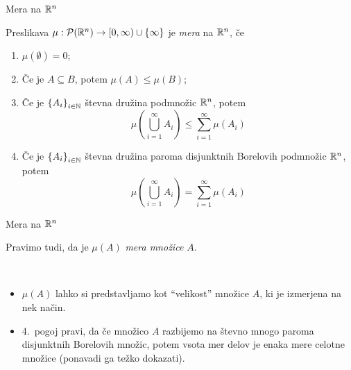 \documentclass[10pt]{beamer}
\begin{document}
\begin{frame}{Mera na \(\mathbb{R}^n\)}
    \begin{definicija}
        Preslikava \(\mu: \mathcal{P}(\mathbb{R}^n) \to [0, \infty) \cup \left\{\infty\right\}\) je \emph{mera} na \(\mathbb{R}^n\), če 
        \begin{enumerate}
            \item \(\mu(\emptyset) = 0\);
            \item Če je \(A \subseteq B\), potem \(\mu(A) \leq \mu(B)\);
            \item Če je \(\left\{A_i\right\}_{i \in \mathbb{N}}\) števna družina podmnožic \(\mathbb{R}^n\), potem 
            \[\mu\left(\bigcup_{i=1}^\infty A_i\right) \leq \sum_{i=1}^{\infty} \mu (A_i)\]
            \item Če je \(\left\{A_i\right\}_{i \in \mathbb{N}}\) števna družina paroma disjunktnih Borelovih podmnožic \(\mathbb{R}^n\), potem 
            \[\mu\left(\bigcup_{i=1}^\infty A_i\right) = \sum_{i=1}^{\infty} \mu (A_i)\]
        \end{enumerate}
    \end{definicija}
\end{frame}

\begin{frame}{Mera na \(\mathbb{R}^n\)}
    \begin{definicija}
            Pravimo tudi, da je \(\mu(A)\) \emph{mera množice \(A\)}.
    \end{definicija}

    \begin{opomba} \
        \begin{itemize}
            \item \(\mu(A)\) lahko si predstavljamo kot "`velikost"' množice \(A\), ki je izmerjena na nek način.
            \item 4.\ pogoj pravi, da če množico \(A\) razbijemo na števno mnogo paroma disjunktnih Borelovih množic, potem vsota mer delov je enaka mere celotne množice (ponavadi ga težko dokazati).
        \end{itemize}
    \end{opomba}
\end{frame}
\end{document}
